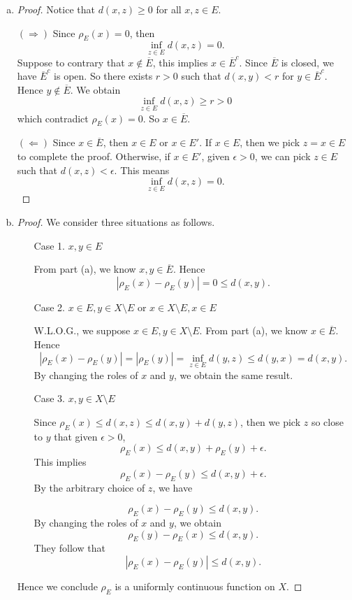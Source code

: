\begin{Exercise}
\begin{enumerate}[(a)]
\item
\begin{proof}
Notice that $d(x,z)\geq 0$ for all $x,z\in E$.

$(\Longrightarrow)$
Since $\rho_E(x) = 0$, then
$$
\inf_{z\in E}d(x,z) = 0.
$$
Suppose to contrary that $x\notin \overline{E}$, this implies $x\in \overline{E}^c$. Since $\overline{E}$ is closed, we have $\overline{E}^c$ is open. So there exists $r>0$ such that $d(x,y)<r$ for $y\in \overline{E}^c$. Hence $y\notin \overline{E}$. We obtain
$$
\inf_{z\in E}d(x,z) \geq r > 0
$$
which contradict $\rho_E(x) = 0$. So $x\in \overline{E}$.

\vspace{2ex}

$(\Longleftarrow)$
Since $x\in \overline{E}$, then $x\in E$ or $x\in E'$. If $x\in E$, then we pick $z=x\in E$ to complete the proof. Otherwise, if $x\in E'$, given $\epsilon>0$, we can pick $z\in E$ such that $d(x,z)<\epsilon$. This means
$$
\inf_{z\in E}d(x,z) = 0.
$$
\end{proof}

\item 
\begin{proof}
We consider three situations as follows.

\begin{enumerate}
\item[Case 1.] $x,y\in E$

From part (a), we know $x,y\in \overline{E}$. Hence
$$
\left| \rho_E(x) - \rho_E(y) \right| = 0 \leq d(x,y).
$$

\item[Case 2.] $x\in E,y\in X\setminus E$ or $x\in X\setminus E,x\in E$

W.L.O.G., we suppose $x\in E,y\in X\setminus E$. From part (a), we know $x\in \overline{E}$. Hence
$$
\left| \rho_E(x) - \rho_E(y) \right| 
= |\rho_E(y)| 
= \inf_{z\in E}d(y,z)
\leq d(y,x)
= d(x,y).
$$
By changing the roles of $x$ and $y$, we obtain the same result.

\item[Case 3.] $x,y\in X\setminus E$

Since $\rho_E(x) \leq d(x,z) \leq d(x,y) + d(y,z)$, then we pick $z$ so close to $y$ that given $\epsilon>0$,
$$
\rho_E(x) \leq d(x,y) + \rho_E(y) + \epsilon.
$$
This implies
$$
\rho_E(x) - \rho_E(y) \leq d(x,y) + \epsilon.
$$
By the arbitrary choice of $z$, we have

$$
\rho_E(x) - \rho_E(y) \leq d(x,y).
$$
By changing the roles of $x$ and $y$, we obtain
$$
\rho_E(y) - \rho_E(x) \leq d(x,y).
$$
They follow that
$$
\left| \rho_E(x) - \rho_E(y) \right| \leq d(x,y).
$$
\end{enumerate}
Hence we conclude $\rho_E$ is a uniformly continuous function on $X$.
\end{proof}
\end{enumerate}
\end{Exercise}